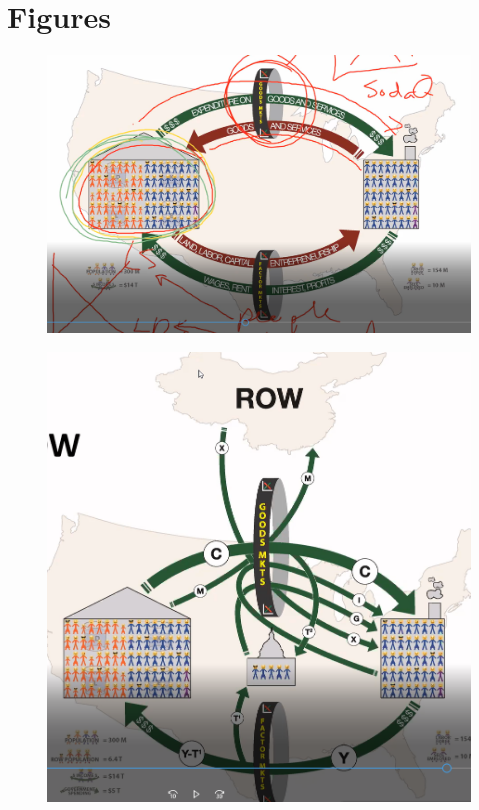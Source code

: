\documentclass[openany]{book}
\begin{document}
\chapter{Figures}
\begin{figure}[H]
    \centering
    \includegraphics[width=14cm]{figs/Captura.PNG} 
\end{figure}
\begin{figure}[H]
    \centering
    \includegraphics[width=14cm]{figs/Captura1.PNG}  
\end{figure}




\end{document}
